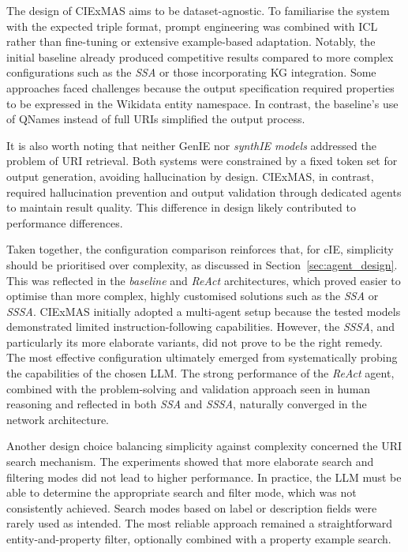 \documentclass[a4paper,oneside,bibliography=totoc]{scrbook}
\begin{document}
The design of CIExMAS aims to be dataset-agnostic. To familiarise the system with the expected triple format, prompt engineering was combined with \ac{ICL} rather than fine-tuning or extensive example-based adaptation. Notably, the initial baseline already produced competitive results compared to more complex configurations such as the \textit{\ac{SSA}} or those incorporating \ac{KG} integration. Some approaches faced challenges because the output specification required properties to be expressed in the Wikidata entity namespace. In contrast, the baseline’s use of QNames instead of full \acp{URI} simplified the output process.

It is also worth noting that neither GenIE nor \textit{synthIE models} addressed the problem of \ac{URI} retrieval. Both systems were constrained by a fixed token set for output generation, avoiding hallucination by design. CIExMAS, in contrast, required hallucination prevention and output validation through dedicated agents to maintain result quality. This difference in design likely contributed to performance differences.

Taken together, the configuration comparison reinforces that, for \ac{cIE}, simplicity should be prioritised over complexity, as discussed in Section~\ref{sec:agent_design}. This was reflected in the \textit{baseline} and \textit{ReAct} architectures, which proved easier to optimise than more complex, highly customised solutions such as the \textit{\ac{SSA}} or \textit{\ac{SSSA}}. CIExMAS initially adopted a multi-agent setup because the tested models demonstrated limited instruction-following capabilities. However, the \textit{\ac{SSSA}}, and particularly its more elaborate variants, did not prove to be the right remedy. The most effective configuration ultimately emerged from systematically probing the capabilities of the chosen \ac{LLM}. The strong performance of the \textit{ReAct} agent, combined with the problem-solving and validation approach seen in human reasoning and reflected in both \textit{\ac{SSA}} and \textit{\ac{SSSA}}, naturally converged in the network architecture.

Another design choice balancing simplicity against complexity concerned the \ac{URI} search mechanism. The experiments showed that more elaborate search and filtering modes did not lead to higher performance. In practice, the \ac{LLM} must be able to determine the appropriate search and filter mode, which was not consistently achieved. Search modes based on label or description fields were rarely used as intended. The most reliable approach remained a straightforward entity-and-property filter, optionally combined with a property example search.
\end{document}
